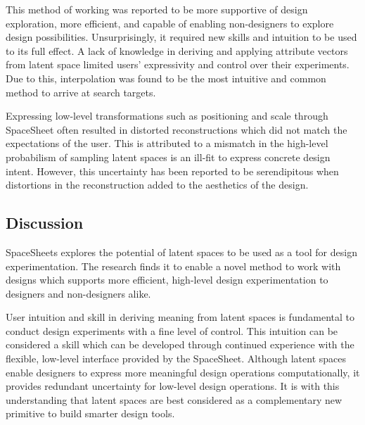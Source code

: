 \documentclass[letterpaper]{article}
\begin{document}
This method of working was reported to be more supportive of design exploration, more efficient, and capable of enabling non-designers to explore design possibilities. Unsurprisingly, it required new skills and intuition to be used to its full effect. A lack of knowledge in deriving and applying attribute vectors from latent space limited users’ expressivity and control over their experiments. Due to this, interpolation was found to be the most intuitive and common method to arrive at search targets.

Expressing low-level transformations such as positioning and scale through SpaceSheet often resulted in distorted reconstructions which did not match the expectations of the user. This is attributed to a mismatch in the high-level probabilism of sampling latent spaces is an ill-fit to express concrete design intent. However, this uncertainty has been reported to be serendipitous when distortions in the reconstruction added to the aesthetics of the design.

\subsection{Discussion}

SpaceSheets explores the potential of latent spaces to be used as a tool for design experimentation. The research finds it to enable a novel method to work with designs which supports more efficient, high-level design experimentation to designers and non-designers alike. 

User intuition and skill in deriving meaning from latent spaces is fundamental to conduct design experiments with a fine level of control. This intuition can be considered a skill which can be developed through continued experience with the flexible, low-level interface provided by the SpaceSheet. Although latent spaces enable designers to express more meaningful design operations computationally, it provides redundant uncertainty for low-level design operations. It is with this understanding that latent spaces are best considered as a complementary new primitive to build smarter design tools.

\pagebreak




\onecolumn

\pagebreak

\normalsize

\end{document}
